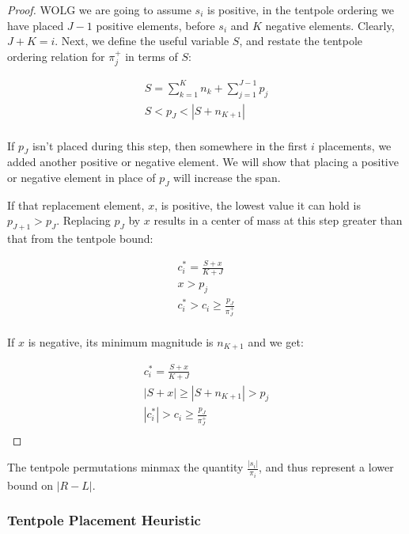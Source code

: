 \begin{proof}
WOLG we are going to assume $s_i$ is positive, in the tentpole ordering we have placed $J-1$ positive elements, before $s_i$ and $K$ negative elements.  Clearly, $J+K=i$.  Next, we define the useful variable $S$, and restate the tentpole ordering relation for $\pi^+_j$ in terms of $S$:

\begin{align*}
S = \sum_{k=1}^{K} n_k + \sum_{j=1}^{J-1} p_j \\
S < p_J < |S + n_{K+1}| \\
\end{align*}

If $p_J$ isn't placed during this step, then somewhere in the first $i$ placements, we added another positive or negative element.  We will show that placing a positive or negative element in place of $p_J$ will increase the span.

If that replacement element, $x$, is positive, the lowest value it can hold is $p_{J+1} > p_J$.  Replacing $p_J$ by $x$ results in a center of mass at this step greater than that from the tentpole bound:

\begin{align*}
c_i^* = \frac{S + x}{K +J} \\
x > p_j \\
c_i^* > c_i \geq \frac{p_J}{\pi^+_J} \\
\end{align*}

If $x$ is negative, its minimum magnitude is $n_{K+1}$ and we get:

\begin{align*}
c_i^* = \frac{S + x}{K +J} \\
|S+x| \geq |S+n_{K+1}|  > p_j \\
|c_i^*| > c_i \geq \frac{p_J}{\pi^+_J} \\
\end{align*}


\end{proof}

\begin{thm} \label{thm:tentpoleBound}
The tentpole permutations minmax the quantity $\frac{|s_i|}{\pi_i}$, and thus represent a lower bound on $|R-L|$.
\end{thm}

\subsubsection{Tentpole Placement Heuristic} \label{sec:tentpoleHeuristic}

